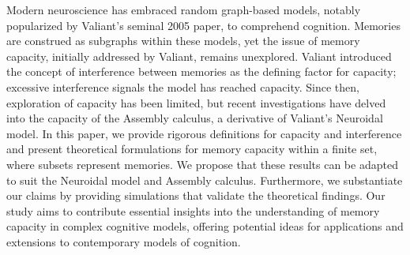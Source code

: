 Modern neuroscience has embraced random graph-based models, notably popularized by Valiant's seminal 2005 paper, to comprehend cognition. Memories are construed as subgraphs within these models, yet the issue of memory capacity, initially addressed by Valiant, remains unexplored. Valiant introduced the concept of interference between memories as the defining factor for capacity; excessive interference signals the model has reached capacity. Since then, exploration of capacity has been limited, but recent investigations have delved into the capacity of the Assembly calculus, a derivative of Valiant's Neuroidal model. In this paper, we provide rigorous definitions for capacity and interference and present theoretical formulations for memory capacity within a finite set, where subsets represent memories. We propose that these results can be adapted to suit the Neuroidal model and Assembly calculus. Furthermore, we substantiate our claims by providing simulations that validate the theoretical findings. Our study aims to contribute essential insights into the understanding of memory capacity in complex cognitive models, offering potential ideas for applications and extensions to contemporary models of cognition. 
